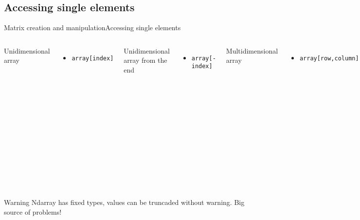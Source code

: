 \documentclass[10pt,compress]{beamer} %
\begin{document}
\subsection{Accessing single elements}
\begin{frame}[fragile]{Matrix creation and manipulation}{Accessing single elements}
	\begin{columns}
		Unidimensional array
		\begin{itemize}
			\item \texttt{array[index]}
		\end{itemize}
		Unidimensional array from the end
		\begin{itemize}
			\item \texttt{array[-index]}
		\end{itemize}
		Multidimensional array
		\begin{itemize}
			\item \texttt{array[row,column]}
		\end{itemize}

		\begin{exampleblock}{}
		\vspace{-0.2cm} 
			\begin{lstlisting}
x = np.array([5, 0, 3, 3, 7, 9])
x[0] # 5
x[4] # 7
x[-1] # 9
x[-2] # 7
x = np.array([[3, 5, 2, 4],
    [7, 6, 8, 8],
    [1, 6, 7, 7]])
x2[2, 0] # 1 
x2[2, -1] # 7
			\end{lstlisting}
		\vspace{-0.2cm} 
		\end{exampleblock}
	\end{columns}

	\smallskip

	\begin{columns}
 	   \column{0.6\textwidth}
		\begin{alertblock}{Warning}
			Ndarray has fixed types, values can be truncaded without warning. Big source of problems!
		\end{alertblock}
	\end{columns}

\end{frame}
\end{document}
